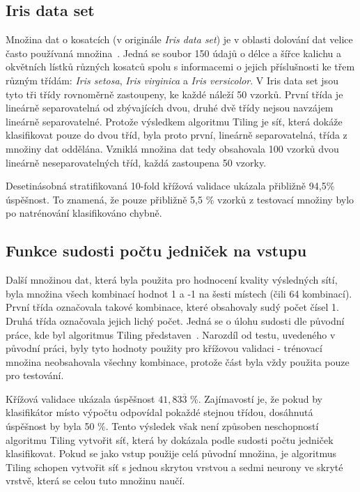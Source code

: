 \documentclass[a4paper, 11pt]{article}
\begin{document}
\subsection*{Iris data set}
Množina dat o kosatcích (v originále \emph{Iris data set}) je v oblasti dolování dat velice často používaná množina~\cite{iris}. Jedná se soubor 150 údajů o délce a šířce kalichu a okvětních lístků různých kosatců spolu s informacemi o jejich příslušnosti ke třem různým třídám: \emph{Iris setosa}, \emph{Iris virginica} a \emph{Iris versicolor}. V Iris data set jsou tyto tři třídy rovnoměrně zastoupeny, ke každé náleží 50 vzorků. První třída je lineárně separovatelná od zbývajících dvou, druhé dvě třídy nejsou navzájem lineárně separovatelné. Protože výsledkem algoritmu Tiling je síť, která dokáže klasifikovat pouze do dvou tříd, byla proto první, lineárně separovatelná, třída z množiny dat oddělána. Vzniklá množina dat tedy obsahovala 100 vzorků dvou lineárně neseparovatelných tříd, každá zastoupena 50 vzorky.

Desetinásobná stratifikovaná 10-fold křížová validace ukázala přibližně 94{,}5\% úspěšnost. To znamená, že pouze přibližně 5{,}5 \% vzorků z testovací množiny bylo po natrénování klasifikováno chybně.

\subsection*{Funkce sudosti počtu jedniček na vstupu}
Další množinou dat, která byla použita pro hodnocení kvality výsledných sítí, byla množina všech kombinací hodnot 1 a -1 na šesti místech (čili 64 kombinací). První třída označovala takové kombinace, které obsahovaly sudý počet čísel 1. Druhá třída označovala jejich lichý počet. Jedná se o úlohu sudosti dle původní práce, kde byl algoritmus Tiling představen~\cite{mezard}. Narozdíl od testu, uvedeného v původní práci, byly tyto hodnoty použity pro křížovou validaci - trénovací množina neobsahovala všechny kombinace, protože část byla vždy použita pouze pro testování.

Křížová validace ukázala úspěšnost $41{,}83\overline{3}$ \%. Zajímavostí je, že pokud by klasifikátor místo výpočtu odpovídal pokaždé stejnou třídou, dosáhnutá úspěšnost by byla 50 \%. Tento výsledek však není způsoben neschopností algoritmu Tiling vytvořit síť, která by dokázala podle sudosti počtu jedniček klasifikovat. Pokud se jako vstup použije celá původní množina, je algoritmus Tiling schopen vytvořit síť s jednou skrytou vrstvou a sedmi neurony ve skryté vrstvě, která se celou tuto množinu naučí.
\end{document}
